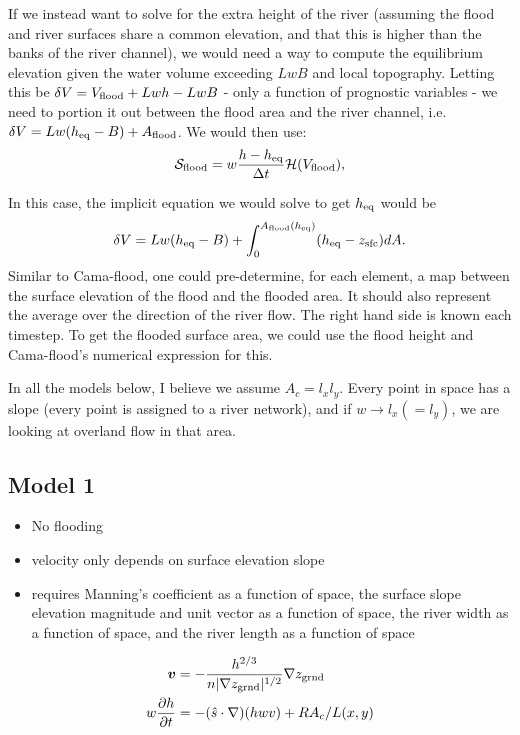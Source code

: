 \documentclass[twoside,10pt]{report}
\begin{document}
If we instead want to solve for the extra height of the river (assuming the flood and river surfaces share a common elevation, and that this is higher than the banks of the river channel), we would need a way to compute the equilibrium elevation given the water volume exceeding $L w B$ and local topography. Letting this be $\delta V = V_{\rm flood}+ Lwh - LwB$ - only a function of prognostic variables -  we need to portion it out between the flood area and the river channel, i.e. $\delta V = L w (h_{\rm eq}-B) + A_{\rm flood}$. We would then use:
\begin{equation}
    \mathcal{S}_{\rm flood} = w\frac{h-h_{\rm eq}}{\Delta t}\mathcal{H}(V_{\rm flood}),
\end{equation}

In this case, the implicit equation we would solve to get $h_{\rm eq}$ would be
\begin{equation}
        \delta V= L w (h_{\rm eq}-B) + \int_0^{A_{\rm flood}(h_{\rm eq})} (h_{\rm eq} - z_{\rm sfc}) dA.
\end{equation}
 Similar to Cama-flood, one could pre-determine, for each element, a map between the surface elevation of the flood and the flooded area. It should also represent the average over the direction of the river flow. The right hand side is known each timestep. To get the flooded surface area, we could use the flood height and Cama-flood's numerical expression for this.




In all the models below, I believe we assume $A_c = l_x l_y$. Every point in space has a slope (every point is assigned to a river network), and if $w \rightarrow l_x (=l_y)$, we are looking at overland flow in that area.
\subsection{Model 1}
\begin{itemize}
    \item No flooding
    \item velocity only depends on surface elevation slope
    \item requires Manning's coefficient as a function of space, the surface slope elevation magnitude and unit vector as a function of space, the river width as a function of space, and the river length as a function of space
\end{itemize}
\begin{align}
     \vec{v} &= -\frac{h^{2/3}}{n|\nabla z_{\rm grnd}|^{1/2}}\nabla z_{\rm grnd} \nonumber \\
     w\frac{\partial h}{\partial t} &= -(\hat{s} \cdot \nabla) (hwv) +  R A_c/L(x,y)
\end{align}
\end{document}
